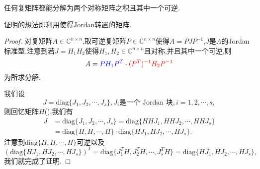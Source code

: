 \documentclass[../../main.tex]{subfiles}
\begin{document}
\begin{proposition}
任何复矩阵都能分解为两个对称矩阵之积且其中一个可逆.
\end{proposition}
\begin{note}
证明的想法即利用\hyperref[lemma:使得Jordan转置的矩阵]{使得Jordan转置的矩阵}.
\end{note}
\begin{proof}
对复矩阵\( A \in \mathbb{C}^{n \times n} \),取可逆复矩阵\( P \in \mathbb{C}^{n \times n} \)使得\( A = P J P^{-1} \),\( J \)是\( A \)的Jordan标准型.注意到若\( J = H_1 H_2 \)使得\( H_1, H_2 \in \mathbb{C}^{n \times n} \)且对称,并且其中一个可逆,则
\[
A = {\color{blue} P H_1 P^T} \cdot {\color{red} (P^T)^{-1} H_2 P^{-1}}
\]
为所求分解.

我们设
\[
J = \text{diag}\{J_1, J_2, \cdots, J_s\}, J_i \text{是一个 Jordan 块}, i = 1, 2, \cdots, s,
\]
则回忆矩阵$H$(),我们有
\[
\begin{aligned}
J &= \text{diag}\{J_1, J_2, \cdots, J_s\} = \text{diag}\{HHJ_1, HHJ_2, \cdots, HHJ_s\} \\
&= \text{diag}\{H, H, \cdots, H\} \cdot \text{diag}\{HJ_1, HJ_2, \cdots, HJ_s\}.
\end{aligned}
\]
注意到\( \text{diag}\{H, H, \cdots, H\} \)可逆以及
\[
(\text{diag}\{HJ_1, HJ_2, \cdots, HJ_s\})^T = \text{diag}\{J_1^T H, J_2^T H, \cdots, J_s^T H\} = \text{diag}\{HJ_1, HJ_2, \cdots, HJ_s\},
\]
我们就完成了证明.

\end{proof}
\end{document}
